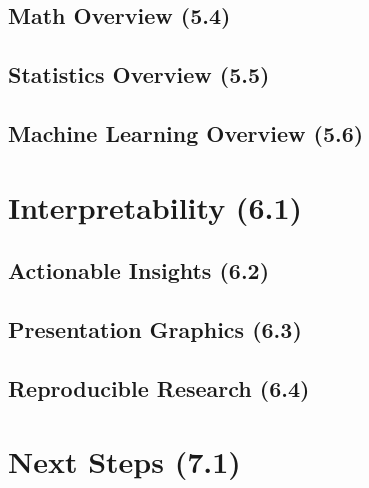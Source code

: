 \subsection{Math Overview (5.4)}
\subsection{Statistics Overview (5.5)}
\subsection{Machine Learning Overview (5.6)}
\section{Interpretability (6.1)}
\subsection{Actionable Insights (6.2)}
\subsection{Presentation Graphics (6.3)}
\subsection{Reproducible Research (6.4)}
\section{Next Steps (7.1)}
